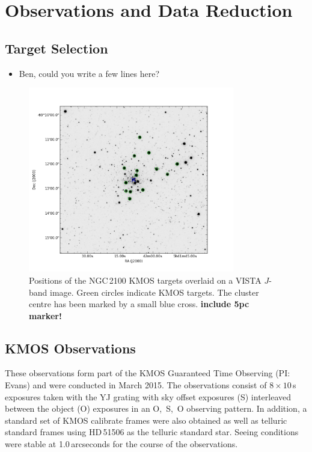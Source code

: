\documentclass[useAMS,usenatbib]{mn2e}
\begin{document}

\section{Observations and Data Reduction} %
\label{sec:observations}
\subsection{Target Selection} %
\label{sub:target_selection}

\begin{itemize}
  \item Ben, could you write a few lines here?
\end{itemize}

\begin{figure}
 \includegraphics[width=9.0cm]{NGC2100-targets}
 \caption{Positions of the NGC\,2100 KMOS targets overlaid on a VISTA $J$-band image.
          Green circles indicate KMOS targets.
          The cluster centre has been marked by a small blue cross.
          \textbf{include 5pc marker!}
\label{fig:targets}
          }
\end{figure}

\subsection{KMOS Observations} %
\label{sub:kmos_observations}

These observations form part of the KMOS Guaranteed Time Observing (PI: Evans) and were conducted in March 2015.
The observations consist of $8\times10$\,s exposures taken with the YJ grating with sky offset exposures (S) interleaved between the object (O) exposures in an O,~S,~O observing pattern.
In addition, a standard set of KMOS calibrate frames were also obtained as well as telluric standard frames using HD\,51506 as the telluric standard star.
Seeing conditions were stable at 1.0\,arcseconds for the course of the observations.
\end{document}
